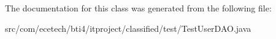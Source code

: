 The documentation for this class was generated from the following file\+:\begin{DoxyCompactItemize}
\item 
src/com/ecetech/bti4/itproject/classified/test/Test\+User\+D\+A\+O.\+java\end{DoxyCompactItemize}
